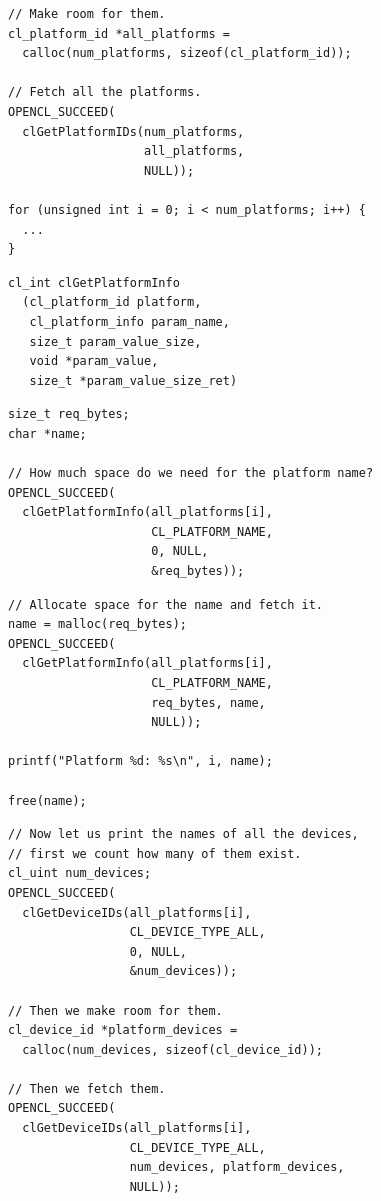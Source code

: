 \documentclass{beamer}
\begin{document}
\begin{frame}[fragile]
\begin{lstlisting}
// Make room for them.
cl_platform_id *all_platforms =
  calloc(num_platforms, sizeof(cl_platform_id));

// Fetch all the platforms.
OPENCL_SUCCEED(
  clGetPlatformIDs(num_platforms,
                   all_platforms,
                   NULL));

for (unsigned int i = 0; i < num_platforms; i++) {
  ...
}
\end{lstlisting}
\end{frame}

\begin{frame}
\begin{lstlisting}[backgroundcolor=\color{lightgray}]
cl_int clGetPlatformInfo
  (cl_platform_id platform,
   cl_platform_info param_name,
   size_t param_value_size,
   void *param_value,
   size_t *param_value_size_ret)
\end{lstlisting}

\begin{lstlisting}
size_t req_bytes;
char *name;

// How much space do we need for the platform name?
OPENCL_SUCCEED(
  clGetPlatformInfo(all_platforms[i],
                    CL_PLATFORM_NAME,
                    0, NULL,
                    &req_bytes));
\end{lstlisting}
\end{frame}

\begin{frame}[fragile]
\begin{lstlisting}
// Allocate space for the name and fetch it.
name = malloc(req_bytes);
OPENCL_SUCCEED(
  clGetPlatformInfo(all_platforms[i],
                    CL_PLATFORM_NAME,
                    req_bytes, name,
                    NULL));

printf("Platform %d: %s\n", i, name);

free(name);
\end{lstlisting}
\end{frame}

\begin{frame}[fragile]
\begin{lstlisting}
// Now let us print the names of all the devices,
// first we count how many of them exist.
cl_uint num_devices;
OPENCL_SUCCEED(
  clGetDeviceIDs(all_platforms[i],
                 CL_DEVICE_TYPE_ALL,
                 0, NULL,
                 &num_devices));

// Then we make room for them.
cl_device_id *platform_devices =
  calloc(num_devices, sizeof(cl_device_id));

// Then we fetch them.
OPENCL_SUCCEED(
  clGetDeviceIDs(all_platforms[i],
                 CL_DEVICE_TYPE_ALL,
                 num_devices, platform_devices,
                 NULL));
\end{lstlisting}
\end{frame}
\end{document}
